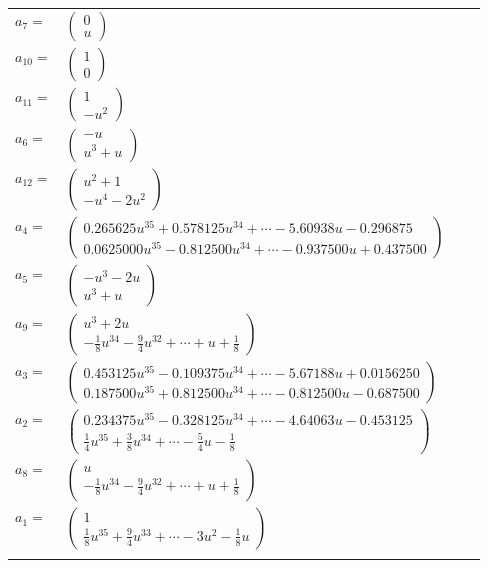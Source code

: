 \documentclass[1p]{elsarticle_modified}
\theoremstyle{definition}
\begin{document}
\begin{tabular}{m{7pt} m{180pt} m{7pt} m{180pt} }
\flushright $a_{7}=$&$\begin{pmatrix}0\\u\end{pmatrix}$ \\
\flushright $a_{10}=$&$\begin{pmatrix}1\\0\end{pmatrix}$ \\
\flushright $a_{11}=$&$\begin{pmatrix}1\\- u^2\end{pmatrix}$ \\
\flushright $a_{6}=$&$\begin{pmatrix}- u\\u^3+u\end{pmatrix}$ \\
\flushright $a_{12}=$&$\begin{pmatrix}u^2+1\\- u^4-2 u^2\end{pmatrix}$ \\
\flushright $a_{4}=$&$\begin{pmatrix}0.265625 u^{35}+0.578125 u^{34}+\cdots-5.60938 u-0.296875\\0.0625000 u^{35}-0.812500 u^{34}+\cdots-0.937500 u+0.437500\end{pmatrix}$ \\
\flushright $a_{5}=$&$\begin{pmatrix}- u^3-2 u\\u^3+u\end{pmatrix}$ \\
\flushright $a_{9}=$&$\begin{pmatrix}u^3+2 u\\-\frac{1}{8} u^{34}-\frac{9}{4} u^{32}+\cdots+u+\frac{1}{8}\end{pmatrix}$ \\
\flushright $a_{3}=$&$\begin{pmatrix}0.453125 u^{35}-0.109375 u^{34}+\cdots-5.67188 u+0.0156250\\0.187500 u^{35}+0.812500 u^{34}+\cdots-0.812500 u-0.687500\end{pmatrix}$ \\
\flushright $a_{2}=$&$\begin{pmatrix}0.234375 u^{35}-0.328125 u^{34}+\cdots-4.64063 u-0.453125\\\frac{1}{4} u^{35}+\frac{3}{8} u^{34}+\cdots-\frac{5}{4} u-\frac{1}{8}\end{pmatrix}$ \\
\flushright $a_{8}=$&$\begin{pmatrix}u\\-\frac{1}{8} u^{34}-\frac{9}{4} u^{32}+\cdots+u+\frac{1}{8}\end{pmatrix}$ \\
\flushright $a_{1}=$&$\begin{pmatrix}1\\\frac{1}{8} u^{35}+\frac{9}{4} u^{33}+\cdots-3 u^2-\frac{1}{8} u\end{pmatrix}$\\&\end{tabular}
\end{document}
